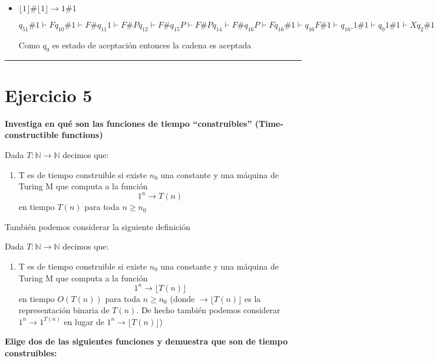 \documentclass[12pt,letterpaper]{article}
\newcommand{\lineaxd}{{\color{brown}\rule{\linewidth}{0.5mm}}}
\begin{document}
\begin{itemize}
    No hay transiciones definidas a en es estado con tal símbolo de entrada, por lo cual consideramos como rechazo
    
    \item $\lfloor 1 \rfloor \# \lfloor 1 \rfloor \longrightarrow 1 \# 1$
    
    $q_51\#1 \vdash Fq_{10}\#1 \vdash F\#q_{11}1 \vdash F\#Pq_{12} \vdash F\#q_{15}P \vdash F\#Pq_{14} \vdash F\#q_{16}P \vdash Fq_{16}\#1 \vdash q_{16}F\#1 \vdash q_{16}\_1\#1 \vdash  q_{0}1\#1 \vdash Xq_2\#1 \vdash X\#q_41 \vdash X\#q_4Y \vdash X\#q_7Y \vdash X\#Yq_9$
    
    Como $q_9$ es estado de aceptación entonces la cadena es aceptada
\end{itemize}

\lineaxd

\section*{Ejercicio 5}

\textbf{Investiga en qué son las funciones de tiempo “construibles” (Time-constructible functions)}

Dada  $T: \mathbb{N} \rightarrow \mathbb{N}$  decimos que:

\begin{enumerate}
    \item T es de tiempo construible si existe $n_0$ una constante y una máquina de Turing M que computa a la función 
    $$ 1^{n} \rightarrow  T(n)  $$ en tiempo $T(n)$ para toda $n \geq n_0$
\end{enumerate}

\newpage

También podemos considerar la siguiente definición

Dada  $T: \mathbb{N} \rightarrow \mathbb{N}$  decimos que:

\begin{enumerate}[2.]
  \item T es de tiempo construible si existe $n_0$ una constante y una máquina de Turing M que computa a la función 
    $$ 1^{n} \rightarrow \lfloor T(n) \rfloor $$ en tiempo $O(T(n))$ para toda $n \geq n_0$ (donde $\rightarrow \lfloor T(n) \rfloor $ es la representación binaria de $T(n)$. De hecho también podemos considerar $ 1^{n} \rightarrow 1^{T(n)} $ en lugar de $ 1^{n} \rightarrow \lfloor T(n) \rfloor$)
\end{enumerate}

\textbf{Elige dos de las siguientes funciones y demuestra que son de tiempo construibles:}
\end{document}
